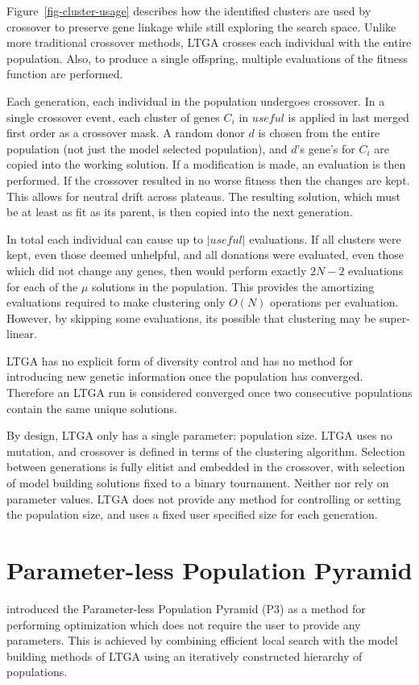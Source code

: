 \documentclass[twoside]{article}
\begin{document}
Figure~\ref{fig-cluster-usage} describes how the identified clusters are used by crossover to preserve
gene linkage while still exploring the search space. Unlike more traditional crossover methods, LTGA
crosses each individual with the entire population. Also, to produce a single offspring, multiple evaluations
of the fitness function are performed.

Each generation, each individual in the population undergoes crossover. In a single crossover event, each
cluster of genes $C_i$ in $useful$ is applied in last merged first order as a crossover mask. A random donor $d$
is chosen from the entire population (not just the model selected population), and $d$'s gene's for $C_i$ are copied
into the working solution. If a modification is made, an evaluation is then performed. If the crossover
resulted in no worse fitness then the changes are kept. This allows for neutral drift across plateaus.
The resulting solution, which must be at least as fit as its parent, is then
copied into the next generation.


In total each individual can cause up to $|useful|$ evaluations. If all clusters were kept, even those deemed
unhelpful, and all donations were evaluated, even those which did not change any genes, then 
would perform exactly $2N-2$ evaluations for each of the $\mu$ solutions in the population. This provides the amortizing evaluations
required to make clustering only $O(N)$ operations per evaluation. However, by skipping some evaluations, its
possible that clustering may be super-linear.

LTGA has no explicit form of diversity control and has no method for introducing new genetic information once
the population has converged. Therefore an LTGA run is considered converged once two consecutive populations
contain the same unique solutions.

By design, LTGA only has a single parameter: population size. LTGA uses no mutation, and crossover is defined
in terms of the clustering algorithm. Selection between generations is fully elitist and embedded in the crossover,
with selection of model building solutions fixed to a binary tournament. Neither  nor
 rely on parameter values. LTGA does not provide any method for controlling or setting
the population size, and uses a fixed user specified size for each generation.

\section{Parameter-less Population Pyramid}
\cite{goldman:2014:p3} introduced the Parameter-less Population Pyramid (P3) as a method for
performing optimization which does not require the user to provide any parameters. This is
achieved by combining efficient local search with the model building methods of LTGA using
an iteratively constructed hierarchy of populations.
\end{document}

